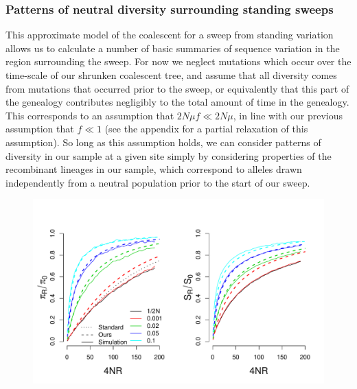 \documentclass[a4paper,10pt]{article}
\begin{document}
\subsubsection*{Patterns of neutral diversity surrounding standing sweeps}
This approximate model of the coalescent for a sweep from standing variation allows us to calculate a number of basic summaries of sequence variation in the region surrounding the sweep. For now we neglect mutations which occur over the time-scale of our shrunken coalescent tree, and assume that all diversity comes from mutations that occurred prior to the sweep, or equivalently that this part of the genealogy contributes negligibly to the total amount of time in the genealogy. This corresponds to an assumption that $2N \mu f \ll 2N\mu$, in line with our previous assumption that $f \ll 1$ (see the appendix for a partial relaxation of this assumption). So long as this assumption holds, we can consider patterns of diversity in our sample at a given site simply by considering properties of the recombinant lineages in our sample, which correspond to alleles drawn independently from a neutral population prior to the start of our sweep.

\begin{figure}
	\includegraphics[width = \textwidth]{../Paper_Figures/pi_and_S_density.pdf} \label{pi_plot}
\end{figure}
\end{document}
